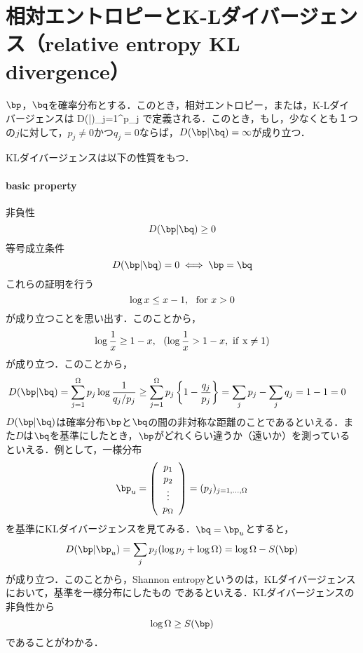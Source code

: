 \section{相対エントロピーとK-Lダイバージェンス（relative entropy KL divergence）}
\begin{kotak}
	\begin{definition}
	$\bp$，$\bq$を確率分布とする．このとき，相対エントロピー，または，K-Lダイバージェンスは
	\be
	D(\bp|\bq)\equiv\sum_{j=1}^{\Omega}p_j
	\ee
	で定義される．このとき，もし，少なくとも１つの$j$に対して，$p_j\neq0$かつ$q_j=0$ならば，$D(\bp|\bq)=\infty$が成り立つ．
	\end{definition}
\end{kotak}
KLダイバージェンスは以下の性質をもつ．
\paragraph{basic property}
非負性
\begin{equation}
    D(\bp|\bq)\geq0
\end{equation}
等号成立条件
\begin{equation}
    D(\bp|\bq)=0\iff \bp=\bq
\end{equation}
これらの証明を行う
\begin{equation}
    \log{x}\leq x-1,\ \ {\rm{for}}\ x>0
\end{equation}
が成り立つことを思い出す．このことから，
\begin{equation}
    \log{\frac{1}{x}}\geq1-x,\ \ ( \log{\frac{1}{x}}>1-x,\ \rm{if}\ x\neq1)
\end{equation}
が成り立つ．このことから，
\begin{align}
    D(\bp|\bq)&=\sum_{j=1}^{\Omega}p_j\log{\frac{1}{q_j/p_j}}\geq \sum_{j=1}^{\Omega}p_j\left\{1-\frac{q_j}{p_j}\right\}=\sum_jp_j-\sum_jq_j=1-1=0
\end{align}
$D(\bp|\bq)$は確率分布$\bp$と$\bq$の間の非対称な距離のことであるといえる．また$D$は$\bq$を基準にしたとき，$\bp$がどれくらい違うか（遠いか）を測っているといえる．例として，一様分布
\begin{equation}
    \bp_u= \left(
        \begin{array}{c}
        p_1 \\
        p_2 \\
        \vdots \\
        p_\Omega
        \end{array}
        \right)
        =(p_j)_{j=1,\ldots,\Omega}
\end{equation}
を基準にKLダイバージェンスを見てみる．$\bq=\bp_u$とすると，
\begin{align}
    D(\bp|\bp_u)=\sum_j p_j(\log{p_j}+\log{\Omega})=\log{\Omega}-S(\bp)
\end{align}
が成り立つ．このことから，Shannon entropyというのは，KLダイバージェンスにおいて，基準を一様分布にしたもの
であるといえる．KLダイバージェンスの非負性から
\begin{equation}
    \log{\Omega}\geq S(\bp)
\end{equation}
であることがわかる．






